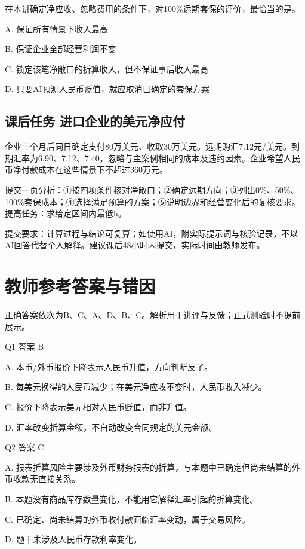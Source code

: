 \documentclass[lang=cn,11pt,oneside,openany,chinesefont=nofont,color=blue,titlestyle=hang]{elegantbook}
\begin{document}
在本讲确定净应收、忽略费用的条件下，对100\%远期套保的评价，最恰当的是。

A. 保证所有情景下收入最高

B. 保证企业全部经营利润不变

C. 锁定该笔净敞口的折算收入，但不保证事后收入最高

D. 只要AI预测人民币贬值，就应取消已确定的套保方案

\subsection*{课后任务  进口企业的美元净应付}

企业三个月后同日确定支付80万美元、收取30万美元。远期购汇7.12元/美元。到期汇率为6.90、7.12、7.40，忽略与主案例相同的成本及违约因素。企业希望人民币净付款成本在这些情景下不超过360万元。

提交一页分析：①按四项条件核对净敞口；②确定远期方向；③列出0\%、50\%、100\%套保成本；④选择满足预算的方案；⑤说明边界和经营变化后的复核要求。提高任务：求给定区间内最低h。

提交要求：计算过程与结论可复算；如使用AI，附实际提示词与核验记录，不以AI回答代替个人解释。建议课后48小时内提交，实际时间由教师发布。

\clearpage

\section{教师参考答案与错因}\label{sec:g18}

\begingroup\small{}\setlength{\parskip}{3pt}
正确答案依次为B、C、A、D、B、C。解析用于讲评与反馈；正式测验时不提前展示。

Q1  答案 B

A. 本币/外币报价下降表示人民币升值，方向判断反了。

B. 每美元换得的人民币减少；在美元净应收不变时，人民币收入减少。

C. 报价下降表示美元相对人民币贬值，而非升值。

D. 汇率改变折算金额，不自动改变合同规定的美元金额。

Q2  答案 C

A. 报表折算风险主要涉及外币财务报表的折算，与本题中已确定但尚未结算的外币收款无直接关系。

B. 本题没有商品库存数量变化，不能用它解释汇率引起的折算变化。

C. 已确定、尚未结算的外币收付款面临汇率变动，属于交易风险。

D. 题干未涉及人民币存款利率变化。
\end{document}
